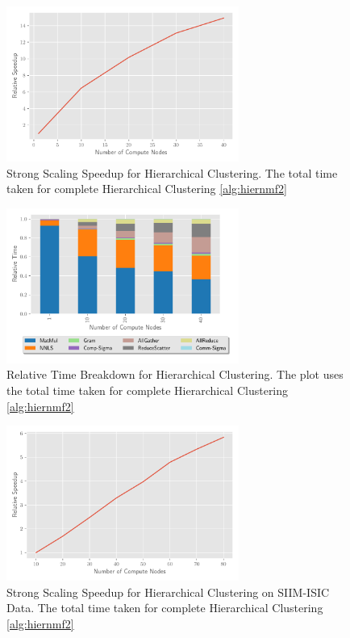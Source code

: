\documentclass[conference,compsoc]{IEEEtran}
\newcommand{\image}{SIIM-ISIC}
\begin{document}
\begin{figure}
\begin{center}
\includegraphics[height=2in, width=\columnwidth]{plots/synthetic_hierarchical_speedup.pdf}
\caption{Strong Scaling Speedup for Hierarchical Clustering. The total time taken for complete Hierarchical Clustering \cref{alg:hiernmf2}}
\label{fig:synhierspeedup}
\end{center}
\end{figure}

\begin{figure}
\begin{center}
\includegraphics[height=2in, width=\columnwidth]{plots/synthetic_hier_strongscaling.pdf}
\caption{Relative Time Breakdown for Hierarchical Clustering. The plot uses the total time taken for complete Hierarchical Clustering \cref{alg:hiernmf2}}
\label{fig:synhierstrongscaling}
\end{center}
\end{figure}

\begin{figure}
\begin{center}
\includegraphics[height=2in, width=\columnwidth]{plots/realworld_hierarchical_speedup.pdf}
\caption{Strong Scaling Speedup for Hierarchical Clustering on \image{} Data. The total time taken for complete Hierarchical Clustering \cref{alg:hiernmf2}}
\label{fig:rwhierspeedup}
\end{center}
\end{figure}
\end{document}
